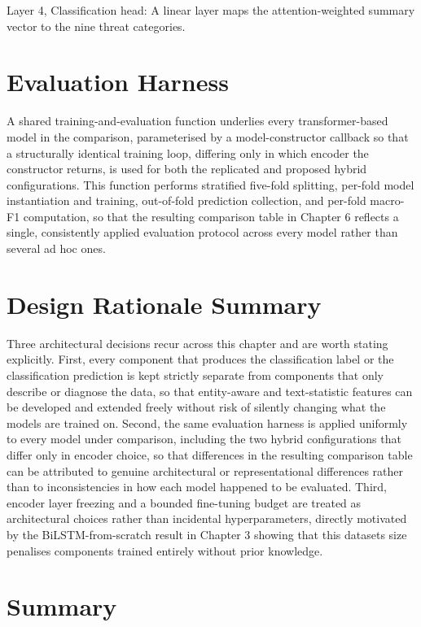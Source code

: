\documentclass[12pt,a4paper]{report}
\begin{document}
Layer 4, Classification head: A linear layer maps the attention-weighted
summary vector to the nine threat categories.
\section{Evaluation Harness}\label{evaluation-harness}

A shared training-and-evaluation function underlies every
transformer-based model in the comparison, parameterised by a
model-constructor callback so that a structurally identical training
loop, differing only in which encoder the constructor returns, is used
for both the replicated and proposed hybrid configurations. This
function performs stratified five-fold splitting, per-fold model
instantiation and training, out-of-fold prediction collection, and
per-fold macro-F1 computation, so that the resulting comparison table in
Chapter 6 reflects a single, consistently applied evaluation protocol
across every model rather than several ad hoc ones.
\section{Design Rationale
Summary}\label{design-rationale-summary}

Three architectural decisions recur across this chapter and are worth
stating explicitly. First, every component that produces the
classification label or the classification prediction is kept strictly
separate from components that only describe or diagnose the data, so
that entity-aware and text-statistic features can be developed and
extended freely without risk of silently changing what the models are
trained on. Second, the same evaluation harness is applied uniformly to
every model under comparison, including the two hybrid configurations
that differ only in encoder choice, so that differences in the resulting
comparison table can be attributed to genuine architectural or
representational differences rather than to inconsistencies in how each
model happened to be evaluated. Third, encoder layer freezing and a
bounded fine-tuning budget are treated as architectural choices rather
than incidental hyperparameters, directly motivated by the
BiLSTM-from-scratch result in Chapter 3 showing that this
dataset\textquotesingle s size penalises components trained entirely
without prior knowledge.
\section{Summary}\label{summary-1}
\end{document}
